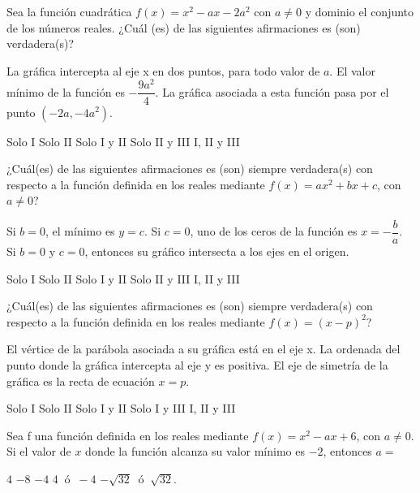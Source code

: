 \documentclass[sin nombre]{srs}
\begin{document}
\begin{preguntas}[after-item-skip=2cm]
\pregunta Sea la función cuadrática $f\left(x\right) = x^{2} - ax - 2a^{2}$ con $a \neq 0$ y dominio el conjunto de los números reales. ¿Cuál (es) de las siguientes afirmaciones es (son) verdadera(s)?
\begin{verticali}
\alternativa La gráfica intercepta al eje x en dos puntos, para todo valor de $a$.
\alternativa El valor mínimo de la función es $-\dfrac{9a^{2}}{4}$.
\alternativa La gráfica asociada a esta función pasa por el punto $\left(-2a, -4a^{2}\right)$.
\end{verticali}
\begin{vertical}
\alternativa Solo I
\alternativa Solo II
\alternativa Solo I y II
\alternativa Solo II y III
\alternativa I, II y III
\end{vertical}

\pregunta ¿Cuál(es) de las siguientes afirmaciones es (son) siempre verdadera(s) con respecto a la función definida en los reales mediante $f\left(x\right) = ax^{2} + bx + c$, con $a \neq 0$?
\begin{verticali}
\alternativa Si $b = 0$, el mínimo es $y = c$.
\alternativa Si $c = 0$, uno de los ceros de la función es $x = - \dfrac{b}{a}$.
\alternativa Si $b=0$ y $c = 0$, entonces su gráfico intersecta a los ejes en el origen.
\end{verticali}
\begin{vertical}
\alternativa Solo I
\alternativa Solo II
\alternativa Solo I y II
\alternativa Solo II y III
\alternativa I, II y III
\end{vertical}

\pregunta ¿Cuál(es) de las siguientes afirmaciones es (son) siempre verdadera(s) con respecto a la función definida en los reales mediante $f\left(x\right) = \left(x - p\right)^{2}$?
\begin{verticali}
\alternativa El vértice de la parábola asociada a su gráfica está en el eje x.
\alternativa La ordenada del punto donde la gráfica intercepta al eje y es positiva.
\alternativa El eje de simetría de la gráfica es la recta de ecuación $x = p$.
\end{verticali}
\begin{vertical}
\alternativa Solo I
\alternativa Solo II
\alternativa Solo I y II
\alternativa Solo I y III
\alternativa I, II y III
\end{vertical}

\pregunta Sea f una función definida en los reales mediante $f\left(x\right) = x^{2} - ax + 6$, con $a \neq 0$. Si el valor de $x$ donde la función alcanza su valor mínimo es $-2$, entonces $a =$
\begin{vertical}
\alternativa $4$
\alternativa $-8$
\alternativa $-4$
\alternativa $4~ \text{ ó }~ -4$
\alternativa $-\sqrt{32} ~\text{ ó }~ \sqrt{32}$.
\end{vertical}


\end{preguntas}
\end{document}
